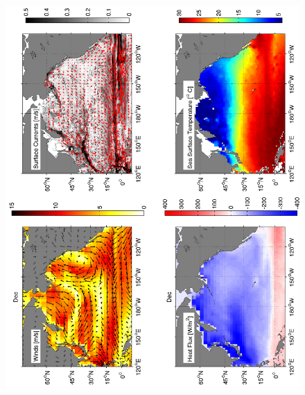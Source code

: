 \begin{figure}[hbt]
  \begin{center}
  \includegraphics[angle=270]{figs/WindOverview/SurfaceCurrents12}
    \caption{}
    \label{fig:}  
  \end{center}
\end{figure}






